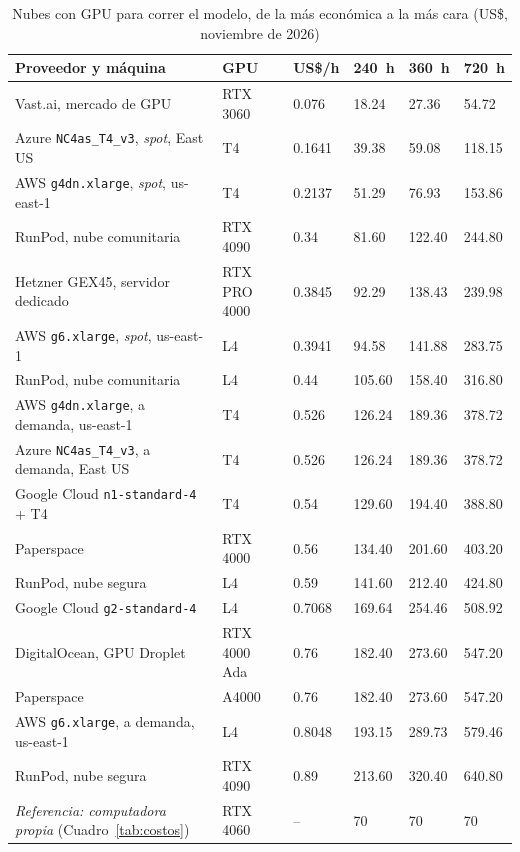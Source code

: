 \documentclass[12pt,a4paper]{article}
\begin{document}
\begin{table}[!ht]
\caption{Nubes con GPU para correr el modelo, de la más económica a la más cara (US\$, noviembre de 2026)}
\label{tab:nube-proveedores}
\centering
\footnotesize
\setlength{\tabcolsep}{4pt}
\renewcommand{\arraystretch}{1.08}
\begin{tabular}{|L{0.45\textwidth}|L{0.13\textwidth}|R{0.06\textwidth}|R{0.06\textwidth}|R{0.06\textwidth}|R{0.06\textwidth}|}
\hline
\textbf{Proveedor y máquina} & \textbf{GPU} & \textbf{US\$/h} & \textbf{240~h} & \textbf{360~h} & \textbf{720~h} \\
\hline
Vast.ai, mercado de GPU~\cite{vast-3060} & RTX 3060 & 0.076 & 18.24 & 27.36 & 54.72 \\
\hline
Azure \texttt{NC4as\_T4\_v3}, \textit{spot}, East US~\cite{sparecores-t4} & T4 & 0.1641 & 39.38 & 59.08 & 118.15 \\
\hline
AWS \texttt{g4dn.xlarge}, \textit{spot}, us-east-1~\cite{doit-g4dn} & T4 & 0.2137 & 51.29 & 76.93 & 153.86 \\
\hline
RunPod, nube comunitaria~\cite{runpod} & RTX 4090 & 0.34 & 81.60 & 122.40 & 244.80 \\
\hline
Hetzner GEX45, servidor dedicado~\cite{hetzner-gex} & RTX PRO 4000 & 0.3845 & 92.29 & 138.43 & 239.98 \\
\hline
AWS \texttt{g6.xlarge}, \textit{spot}, us-east-1~\cite{doit-g6} & L4 & 0.3941 & 94.58 & 141.88 & 283.75 \\
\hline
RunPod, nube comunitaria~\cite{runpod} & L4 & 0.44 & 105.60 & 158.40 & 316.80 \\
\hline
AWS \texttt{g4dn.xlarge}, a demanda, us-east-1~\cite{doit-g4dn} & T4 & 0.526 & 126.24 & 189.36 & 378.72 \\
\hline
Azure \texttt{NC4as\_T4\_v3}, a demanda, East US~\cite{azurespeed-t4} & T4 & 0.526 & 126.24 & 189.36 & 378.72 \\
\hline
Google Cloud \texttt{n1-standard-4} + T4~\cite{gcp-vm,gcp-gpu} & T4 & 0.54 & 129.60 & 194.40 & 388.80 \\
\hline
Paperspace~\cite{paperspace} & RTX 4000 & 0.56 & 134.40 & 201.60 & 403.20 \\
\hline
RunPod, nube segura~\cite{runpod} & L4 & 0.59 & 141.60 & 212.40 & 424.80 \\
\hline
Google Cloud \texttt{g2-standard-4}~\cite{gcp-g2} & L4 & 0.7068 & 169.64 & 254.46 & 508.92 \\
\hline
DigitalOcean, GPU Droplet~\cite{do-gpu} & RTX 4000 Ada & 0.76 & 182.40 & 273.60 & 547.20 \\
\hline
Paperspace~\cite{paperspace} & A4000 & 0.76 & 182.40 & 273.60 & 547.20 \\
\hline
AWS \texttt{g6.xlarge}, a demanda, us-east-1~\cite{doit-g6} & L4 & 0.8048 & 193.15 & 289.73 & 579.46 \\
\hline
RunPod, nube segura~\cite{runpod} & RTX 4090 & 0.89 & 213.60 & 320.40 & 640.80 \\
\hline
\hline
\textit{Referencia: computadora propia} (Cuadro~\ref{tab:costos}) & RTX 4060 & -- & 70 & 70 & 70 \\
\hline
\end{tabular}
\end{table}
\end{document}
